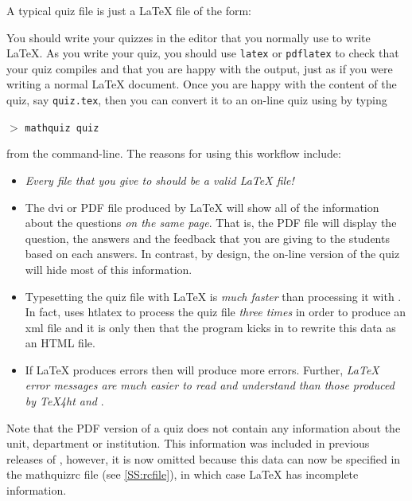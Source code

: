 \documentclass[svgnames]{article}
\newcommand\mathquizrc{\index{mathquizrc}\textsf{mathquizrc}\xspace}
\begin{document}
  A typical \MathQuiz quiz file is just a \LaTeX{} file of the form:

    

  \noindent You should write your quizzes in the editor that you
  normally use to write \LaTeX. As you write your quiz, you should use
  \Verb|latex| or \Verb|pdflatex| to check that your quiz compiles and
  that you are happy with the output, just as if you were writing a
  normal \LaTeX{} document.  Once you are happy with the content of the
  quiz, say \texttt{quiz.tex}, then you can convert it to an on-line quiz using \MathQuiz
  by typing
  \begin{center}
     $>$ \texttt{mathquiz quiz}
  \end{center}
  from the command-line. The reasons for using this workflow include:
  \begin{itemize}
    \item
    \textit{Every file that you give to \MathQuiz should be a valid \LaTeX{} file!}

    \item The \textsf{dvi} or \textsf{PDF} file produced by \LaTeX{}
    will show all of the information about the questions \textit{on the
    same page}. That is, the PDF file will display the question, the
    answers and the feedback that you are giving to the students based
    on each answers. In contrast, by design, the on-line version of the
    quiz will hide most of this information.

    \item Typesetting the quiz file with \LaTeX{} is \textit{much
    faster} than processing it with \MathQuiz. In fact, \MathQuiz uses
    \textsf{htlatex} to process the quiz file \textit{three times} in
    order to produce an \textsf{xml} file and it is only then that the
    \MathQuiz program kicks in to rewrite this data as an \textsf{HTML}
    file.

    \item If \LaTeX{} produces errors then \MathQuiz will produce more
    errors. Further, \textit{\LaTeX{} error messages are much easier to read and
    understand than those produced by \TeX4ht and \MathQuiz}.
  \end{itemize}
  Note that the PDF version of a quiz does not contain any
  information about the unit, department or institution. This
  information was included in previous releases of \MathQuiz, however, it
  is now omitted because this data can now be specified in the \mathquizrc
  file (see \autoref{SS:rcfile}), in which case \LaTeX{} has incomplete information.
\end{document}
